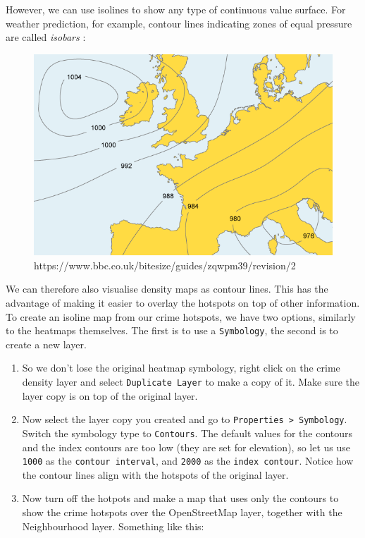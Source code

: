 \documentclass[
  letterpaper,
  DIV=11,
  numbers=noendperiod]{scrreprt}
\begin{document}
However, we can use isolines to show any type of continuous value
surface. For weather prediction, for example, contour lines indicating
zones of equal pressure are called \emph{isobars} :

\begin{figure}[H]

{\centering \includegraphics{images/lab_13/isobar.png}

}

\caption{https://www.bbc.co.uk/bitesize/guides/zqwpm39/revision/2}

\end{figure}%

We can therefore also visualise density maps as contour lines. This has
the advantage of making it easier to overlay the hotspots on top of
other information. To create an isoline map from our crime hotspots, we
have two options, similarly to the heatmaps themselves. The first is to
use a \texttt{Symbology}, the second is to create a new layer.

\begin{enumerate}
\def\labelenumi{(\arabic{enumi})}
\setcounter{enumi}{342}
\item
  So we don't lose the original heatmap symbology, right click on the
  crime density layer and select \texttt{Duplicate\ Layer} to make a
  copy of it. Make sure the layer copy is on top of the original layer.
\item
  Now select the layer copy you created and go to
  \texttt{Properties\ \textgreater{}\ Symbology}. Switch the symbology
  type to \texttt{Contours}. The default values for the contours and the
  index contours are too low (they are set for elevation), so let us use
  \texttt{1000} as the \texttt{contour\ interval}, and \texttt{2000} as
  the \texttt{index\ contour}. Notice how the contour lines align with
  the hotspots of the original layer.
\item
  Now turn off the hotpots and make a map that uses only the contours to
  show the crime hotspots over the OpenStreetMap layer, together with
  the Neighbourhood layer. Something like this:
\end{enumerate}
\end{document}
